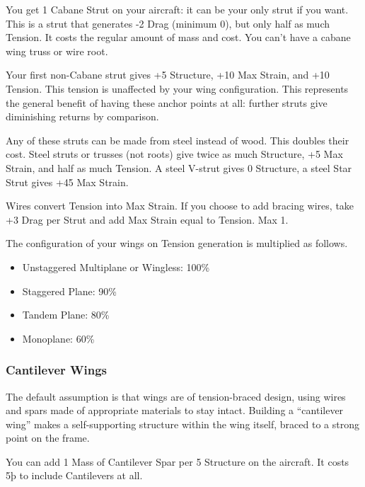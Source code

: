 \documentclass{article}
\begin{document}
You get 1 Cabane Strut on your aircraft: it can be your only
strut if you want. This is a strut that generates -2 Drag (minimum 0),
but only half as much Tension. It costs the regular amount of mass and
cost. You can't have a cabane wing truss or wire root.

Your first non-Cabane strut gives +5 Structure, +10 Max Strain,
and +10 Tension. This tension is unaffected by your wing configuration.
This represents the general benefit of having these anchor points at
all: further struts give diminishing returns by comparison.

Any of these struts can be made from steel instead of wood. This
doubles their cost. Steel struts or trusses (not roots) give twice as
much Structure, +5 Max Strain, and half as much Tension. A steel V-strut
gives 0 Structure, a steel Star Strut gives +45 Max Strain.

Wires convert Tension into Max Strain. If you choose to add
bracing wires, take +3 Drag per Strut and add Max Strain equal to
Tension. Max 1.

The configuration of your wings on Tension generation is
multiplied as follows.

\begin{itemize}
    \item          Unstaggered Multiplane or Wingless: 100\%
    \item          Staggered Plane: 90\%
    \item          Tandem Plane: 80\%
    \item          Monoplane: 60\%
\end{itemize}

\subsubsection{Cantilever Wings}
\label{_Cantilever_Wings}

The default assumption is that wings are of tension-braced design, using
wires and spars made of appropriate materials to stay intact. Building a
``cantilever wing'' makes a self-supporting structure within the wing
itself, braced to a strong point on the frame.

You can add 1 Mass of Cantilever Spar per 5 Structure on the aircraft.
It costs 5þ to include Cantilevers at all.
\end{document}
